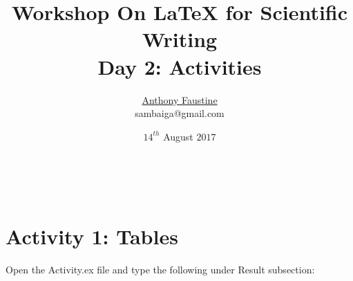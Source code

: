 \documentclass[a4paper,12pt]{article}
\title{{\Large \textbf{ {\color{green} \textbf{Workshop On LaTeX for Scientific Writing} } \\ Day 2: Activities}}}
\author{\href{sambaiga.github.io}{Anthony Faustine} \\sambaiga@gmail.com}
\date{$14^{th}$ August $2017$}
\begin{document}
	\maketitle
	
	
	
	\addtocounter{rom}{1}\setcounter{page}{2}~
	
	
	




\section*{{\color{green} Activity 1: Tables}}
Open the Activity.ex file and type the following under Result subsection:
\end{document}
